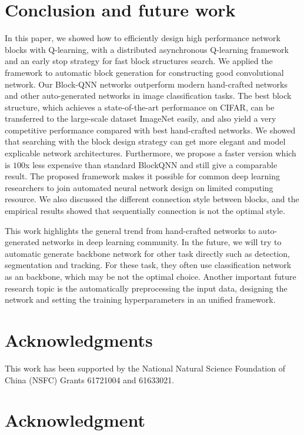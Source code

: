 \documentclass[10pt,journal,compsoc]{IEEEtran}
\begin{document}
\section{Conclusion and future work}
In this paper, we showed how to efficiently design high performance network blocks with Q-learning, with a distributed asynchronous Q-learning framework and an early stop strategy for fast block structures search. We applied the framework to automatic block generation for constructing good convolutional network. Our Block-QNN networks outperform modern hand-crafted networks and other auto-generated networks in image classification tasks. The best block structure, which achieves a state-of-the-art performance on CIFAR, can be transferred to the large-scale dataset ImageNet easily, and also yield a very competitive performance compared with best hand-crafted networks. We showed that searching with the block design strategy can get more elegant and model explicable network architectures. 
Furthermore, we propose a faster version which is $100$x less expensive than standard BlockQNN and still give a comparable result. The proposed framework makes it possible for common deep learning researchers to join automated neural network design on limited computing resource.
We also discussed the different connection style between blocks, and the empirical results showed that sequentially connection is not the optimal style.

This work highlights the general trend from hand-crafted networks to auto-generated networks in deep learning community. In the future, we will try to automatic generate backbone network for other task directly such as detection, segmentation and tracking. For these task, they often use classification network as an backbone, which may be not the optimal choice. Another important future research topic is the automatically preprocessing the input data, designing the network and setting the training hyperparameters in an unified framework.











\ifCLASSOPTIONcompsoc
  \section*{Acknowledgments}
  This work has been supported by the National Natural Science Foundation of China (NSFC) Grants 61721004 and 61633021. 
\else
  \section*{Acknowledgment}
\fi




\ifCLASSOPTIONcaptionsoff
  \newpage
\fi







\end{document}
